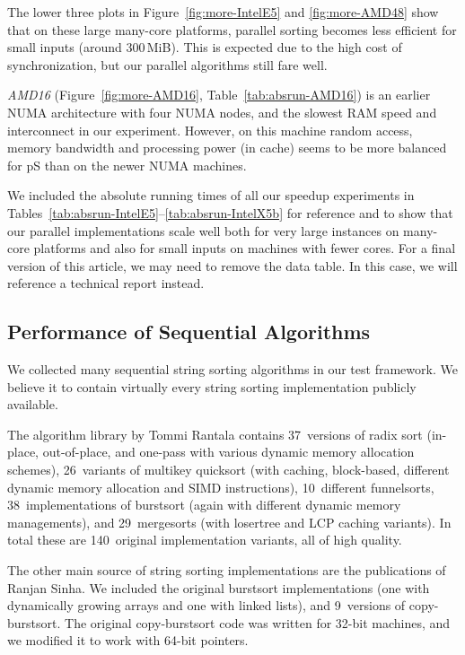 \documentclass[a4paper]{myjournal}
\begin{document}
The lower three plots in Figure~\ref{fig:more-IntelE5} and \ref{fig:more-AMD48}
show that on these large many-core platforms, parallel sorting becomes less
efficient for small inputs (around 300\,MiB). This is expected due to the high
cost of synchronization, but our parallel algorithms still fare well.

\emph{AMD16} (Figure~\ref{fig:more-AMD16}, Table~\ref{tab:absrun-AMD16}) is an earlier NUMA architecture with
four NUMA nodes, and the slowest RAM speed and interconnect in our
experiment. However, on this machine random access, memory bandwidth and
processing power (in cache) seems to be more balanced for pS than on the
newer NUMA machines.

We included the absolute running times of all our speedup experiments in
Tables~\ref{tab:absrun-IntelE5}--\ref{tab:absrun-IntelX5b} for reference and to
show that our parallel implementations scale well both for very large instances
on many-core platforms and also for small inputs on machines with fewer cores.
For a final version of this article, we may need to remove the data
table. In this case, we will reference a technical report instead.

\subsection{Performance of Sequential Algorithms}\label{sec:exp-sequential}

We collected many sequential string sorting algorithms in our test framework. We
believe it to contain virtually every string sorting implementation publicly
available.

The algorithm library by Tommi Rantala \cite{rantala2007web} contains 37~versions
of radix sort (in-place, out-of-place, and one-pass with various dynamic memory
allocation schemes), 26~variants of multikey quicksort (with caching,
block-based, different dynamic memory allocation and SIMD instructions),
10~different funnelsorts, 38~implementations of burstsort (again with different
dynamic memory managements), and 29~mergesorts (with losertree and LCP caching
variants). In total these are 140~original implementation variants, all of high
quality.

The other main source of string sorting implementations are the publications of
Ranjan Sinha. We included the original burstsort implementations (one with
dynamically growing arrays and one with linked lists), and 9~versions of
copy-burstsort. The original copy-burstsort code was written for 32-bit
machines, and we modified it to work with 64-bit pointers.
\end{document}
